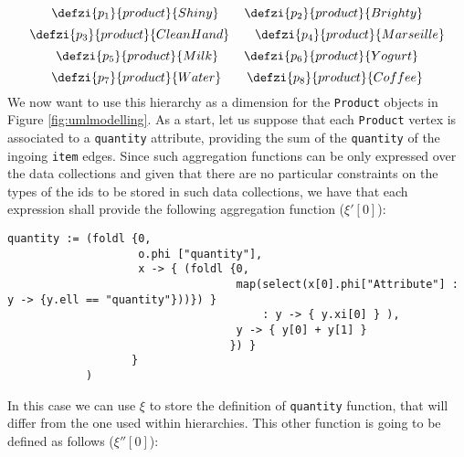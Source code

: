 \begin{example}[continues=ex:inaggr]
	\[\defzi{p_1}{product}{Shiny}\qquad \defzi{p_2}{product}{Brighty}\]
	\[\defzi{p_3}{product}{CleanHand}\qquad \defzi{p_4}{product}{Marseille}\]
	\[\defzi{p_5}{product}{Milk}\qquad \defzi{p_6}{product}{Yogurt}\]
	\[\defzi{p_7}{product}{Water}\qquad \defzi{p_8}{product}{Coffee}\]
%
%
%
We now want to use this hierarchy as a dimension for the \texttt{Product} objects in Figure \vref{fig:umlmodelling}. As a start, let us suppose that each \texttt{Product} vertex is associated to a \texttt{quantity} attribute, providing the sum of the \texttt{quantity} of the ingoing \texttt{item} edges. Since such aggregation functions can be only expressed over the data collections and given that there are no particular constraints on the types of the ids to be stored in such data collections, we have that each expression shall provide the following aggregation function ($\xi'[0]$):
\begin{lstlisting}[language=script,basicstyle=\ttfamily\scriptsize]
quantity := (foldl {0,
                    o.phi ["quantity"],
                    x -> { (foldl {0,
                                   map(select(x[0].phi["Attribute"] : y -> {y.ell == "quantity"}))}) } 
                                       : y -> { y.xi[0] } ),
                                   y -> { y[0] + y[1] }
                                  }) }
                   }
            )
\end{lstlisting}
In this case we can use $\xi$ to store the definition of \texttt{quantity} function, that will differ from the one used within hierarchies. This other function is going to be defined as follows ($\xi''[0]$):
\begin{lstlisting}[language=script,basicstyle=\ttfamily\scriptsize]

\end{lstlisting}
\end{example}
